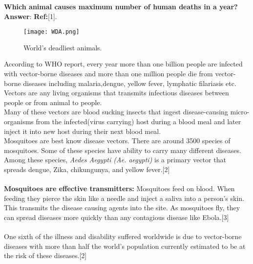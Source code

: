 \documentclass[11pt]{exam}
\begin{document}
\begin{questions}
\question
\label{Q1:Most lethal animal}

\textbf{Which animal causes maximum number of human deaths in a year?}  \\
\textbf{Answer}: \textbf{Ref:}[1].

\begin{figure}[H]
  \centering
   \texttt{[image: WDA.png]}
  \caption{World's deadliest animals.}
   \label{fig: World's deadliest animals }
\end{figure}
According to WHO report, every year more than one billion people are infected with vector-borne diseases and more than one million people die from vector-borne diseases including malaria,dengue, yellow fever, lymphatic filariasis etc. \\
Vectors are any living organisms that transmits infectious diseases between people or from animal to people.\\ %
Many of these vectors are blood sucking insects that ingest disease-causing micro-organisms from the infected(virus carrying) host during a blood meal and later inject it into new host during their next blood meal.     \\
Mosquitoes are best know disease vectors. There are around 3500 species of mosquitoes. Some of these species have ability to carry many different diseases.\\
Among these species, \textit{Aedes Aegypti (Ae. aegypti)} is a primary vector that spreads dengue, Zika, chikungunya, and yellow fever.[2]\\ \\
\textbf{Mosquitoes are effective transmitters:} Mosquitoes feed on blood. When feeding they pierce the skin like a needle and inject a saliva into a person's skin. This transmits the disease causing agents into the site. As mosquitoes fly, they can spread diseases more quickly than any contagious disease like Ebola.[3] \\ \\
One sixth of the illness and disability suffered worldwide is due to vector-borne diseases with more than half the world's population currently estimated to be at the risk of these diseases.[2]  

\end{questions}
\end{document}
